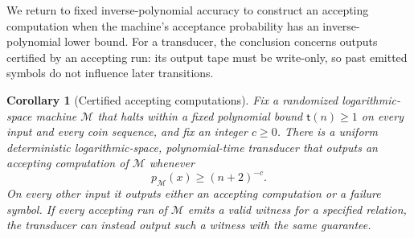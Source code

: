 \documentclass[11pt]{article}
\numberwithin{equation}{section}
\newtheorem{corollary}[theorem]{Corollary}
\theoremstyle{definition}
\theoremstyle{remark}
\begin{document}
We return to fixed inverse-polynomial accuracy to construct an accepting
computation when the machine's acceptance probability has an
inverse-polynomial lower bound.
For a transducer, the conclusion concerns outputs certified by an
accepting run: its output tape must be write-only, so past emitted
symbols do not influence later transitions.

\begin{corollary}[Certified accepting computations]
\label{cor:certified-search}
Fix a randomized logarithmic-space machine $\mathcal M$ that halts
within a fixed polynomial bound ${\mathsf{t}}(n)\ge1$ on every input and every
coin sequence, and fix an integer $c\ge0$. There is a uniform
deterministic logarithmic-space, polynomial-time transducer that
outputs an accepting computation of $\mathcal M$ whenever
\[
 p_{\mathcal M}(x)\ge(n+2)^{-c}.
\]
On every other input it outputs either an accepting computation or
a failure symbol. If every accepting run of $\mathcal M$ emits a
valid witness for a specified relation, the transducer can instead
output such a witness with the same guarantee.
\end{corollary}
\end{document}
